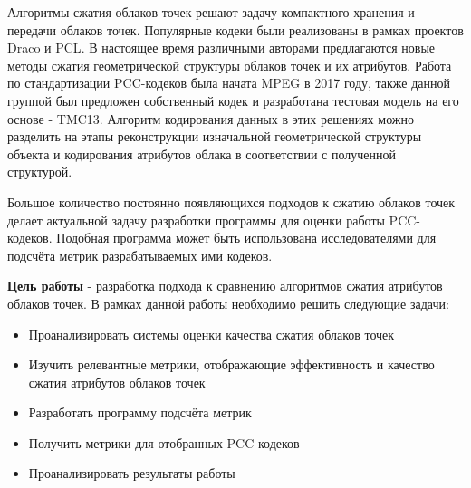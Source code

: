 
Алгоритмы сжатия облаков точек решают задачу компактного хранения и передачи
облаков точек. Популярные кодеки были реализованы в рамках проектов
Draco\cite{Draco} и PCL\cite{Rusu_ICRA2011_PCL}. В настоящее время различными
авторами предлагаются новые методы сжатия геометрической структуры облаков
точек\cite{PCGCv2}\cite{GeoCNNv2} и их
атрибутов\cite{Shao2017}\cite{Chen2020}\cite{Sun2023}. Работа по стандартизации
PCC-кодеков была начата MPEG в 2017 году\cite{CallForProposalV2}, также данной
группой был предложен собственный кодек и разработана тестовая модель на его
основе - TMC13\cite{TMC13}. Алгоритм кодирования данных в этих решениях можно
разделить на этапы реконструкции изначальной геометрической структуры объекта и
кодирования атрибутов облака в соответствии с полученной структурой.

Большое количество постоянно появляющихся подходов к сжатию облаков точек делает
актуальной задачу разработки программы для оценки работы PCC-кодеков. Подобная
программа может быть использована исследователями для подсчёта метрик
разрабатываемых ими кодеков.

\textbf{Цель работы} - разработка подхода к сравнению алгоритмов сжатия
атрибутов облаков точек. В рамках данной работы необходимо решить следующие
задачи:

\begin{itemize}
    \item Проанализировать системы оценки качества сжатия облаков точек
    \item Изучить релевантные метрики, отображающие эффективность и качество
    сжатия атрибутов облаков точек
    \item Разработать программу подсчёта метрик
    \item Получить метрики для отобранных PCC-кодеков
    \item Проанализировать результаты работы
\end{itemize}


